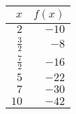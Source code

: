 \begin{tabular}{rr} \toprule
$x$           & $f(x)$ \\\midrule
$2$           & $-10$  \\[6pt]
$\frac{3}{2}$ & $-8$   \\[6pt]
$\frac{7}{2}$ & $-16$  \\[6pt]
$5$           & $-22$  \\[6pt]
$7$           & $-30$  \\[6pt]
$10$          & $-42$  \\\bottomrule
\end{tabular}
